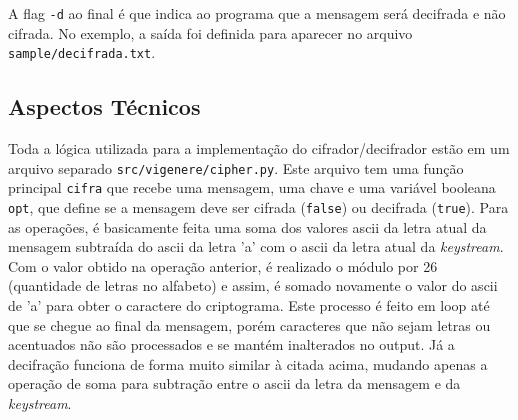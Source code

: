 \documentclass[12pt]{article}
\begin{document}
A flag \texttt{-d} ao final é que indica ao programa que a mensagem será decifrada e não cifrada. No exemplo, a saída foi definida para aparecer no arquivo \texttt{sample/decifrada.txt}.

\subsection{Aspectos Técnicos}
Toda a lógica utilizada para a implementação do cifrador/decifrador estão em um arquivo separado \texttt{src/vigenere/cipher.py}. Este arquivo tem uma função principal \texttt{cifra} que recebe uma mensagem, uma chave e uma variável booleana \texttt{opt}, que define se a mensagem deve ser cifrada (\texttt{false}) ou decifrada (\texttt{true}). Para as operações, é basicamente feita uma soma dos valores ascii da letra atual da mensagem subtraída do ascii da letra 'a' com o ascii da letra atual da \textit{keystream}.
Com o valor obtido na operação anterior, é realizado o módulo por 26 (quantidade de letras no alfabeto) e assim, é somado novamente o valor do ascii de 'a' para obter o caractere do criptograma. Este processo é feito em loop até que se chegue ao final da mensagem, porém caracteres que não sejam letras ou acentuados não são processados e se mantém inalterados no output. Já a decifração funciona de forma muito similar à citada acima, mudando apenas a operação de soma para subtração entre o ascii da letra da mensagem e da \textit{keystream}.
\end{document}
